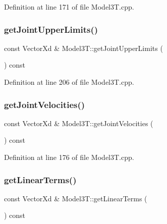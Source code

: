 Definition at line 171 of file Model3\+T.\+cpp.

\hypertarget{classModel3T_a5b2add8312e0251e43cd1027a6a72056}{}\label{classModel3T_a5b2add8312e0251e43cd1027a6a72056} 
\subsubsection{\texorpdfstring{get\+Joint\+Upper\+Limits()}{getJointUpperLimits()}}
{\footnotesize\ttfamily const Vector\+Xd \& Model3\+T\+::get\+Joint\+Upper\+Limits (\begin{DoxyParamCaption}{ }\end{DoxyParamCaption}) const\hspace{0.3cm}{\ttfamily [virtual]}}



Definition at line 206 of file Model3\+T.\+cpp.

\hypertarget{classModel3T_adb503d550d97093a65f19e55725865ca}{}\label{classModel3T_adb503d550d97093a65f19e55725865ca} 
\subsubsection{\texorpdfstring{get\+Joint\+Velocities()}{getJointVelocities()}}
{\footnotesize\ttfamily const Vector\+Xd \& Model3\+T\+::get\+Joint\+Velocities (\begin{DoxyParamCaption}{ }\end{DoxyParamCaption}) const\hspace{0.3cm}{\ttfamily [virtual]}}



Definition at line 176 of file Model3\+T.\+cpp.

\hypertarget{classModel3T_a82b4a52bc8bf966a57a31e54e3efb80c}{}\label{classModel3T_a82b4a52bc8bf966a57a31e54e3efb80c} 
\subsubsection{\texorpdfstring{get\+Linear\+Terms()}{getLinearTerms()}}
{\footnotesize\ttfamily const Vector\+Xd \& Model3\+T\+::get\+Linear\+Terms (\begin{DoxyParamCaption}{ }\end{DoxyParamCaption}) const\hspace{0.3cm}{\ttfamily [virtual]}}



